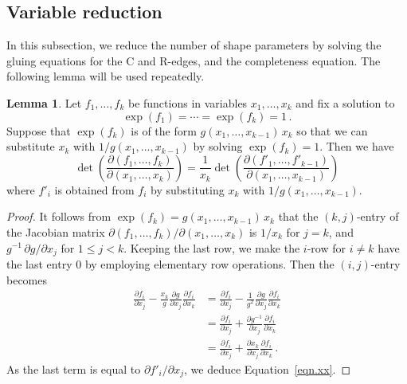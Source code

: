 \documentclass[12pt,reqno]{amsart}
\theoremstyle{definition}
\newtheorem{lemma}[theorem]{Lemma}
\begin{document}
\subsection{Variable reduction}
\label{sec.reduction}

In this subsection, we reduce the number of shape parameters by solving the gluing
equations for the C and R-edges, and the completeness equation. The following lemma
will be used repeatedly.

\begin{lemma}
\label{lem.red}
Let $f_1,\ldots,f_k$ be functions in variables $x_1,\ldots,x_k$ and fix a solution to 
\begin{equation*}
\exp(f_1) = \cdots = \exp(f_k)=1\,.
\end{equation*} Suppose that $\exp(f_k)$ is of the form $g(x_1,\ldots,x_{k-1}) \, x_k$
so that we can substitute $x_k$ with $1/g(x_1,\ldots,x_{k-1})$ by solving $\exp (f_k)=1$.
Then we have
\begin{equation}
\label{eqn.xx}
  \det \left ( \dfrac{\partial (f_1,\ldots,f_k)}{\partial(x_1,\ldots,x_k)} \right)
  = \dfrac{1}{x_k}
\det \left ( \dfrac{\partial (f'_1,\ldots,f'_{k-1})}{\partial(x_1,\ldots,x_{k-1})} \right)
\end{equation}
where $f'_i$ is obtained from $f_i$ by  substituting $x_k$ with $1/g(x_1,\ldots,x_{k-1})$.
\end{lemma}
      
\begin{proof}
It follows from $\exp(f_k) = g(x_1,\ldots,x_{k-1}) \, x_k$ that the $(k,j)$-entry of
the Jacobian matrix $\partial (f_1,\ldots,f_k)/\partial(x_1,\ldots,x_k)$ is $1/x_k$
for $j=k$, and  $g^{-1} \,\partial g / \partial x_j$ for $1 \leq j < k$. Keeping the
last row, we make the $i$-row for $i \neq k$ have the last entry 0 by employing
elementary row operations. Then  the $(i,j)$-entry becomes 
\begin{align*}
  \frac{\partial f_i}{\partial x_j}- \frac{x_k}{g} \frac{\partial g}{\partial x_j}
  \frac{\partial f_{i}}{\partial x_k} & = \frac{\partial f_i}{\partial x_j}
  - \frac{1}{g^2} \frac{\partial g}{\partial x_j} \frac{\partial f_{i}}{\partial x_k} \\
  &=\frac{\partial f_i}{\partial x_j} + \frac{\partial g^{-1}}{\partial x_j}
  \frac{\partial f_{i}}{\partial x_k} \\
  &=\frac{\partial f_i}{\partial x_j} + \frac{\partial x_k}{\partial x_j}
  \frac{\partial f_{i}}{\partial x_k}\,.
\end{align*}
As the last term is equal to $\partial f'_i/\partial x_j$, we deduce
Equation~\eqref{eqn.xx}. 
\end{proof}
\end{document}
